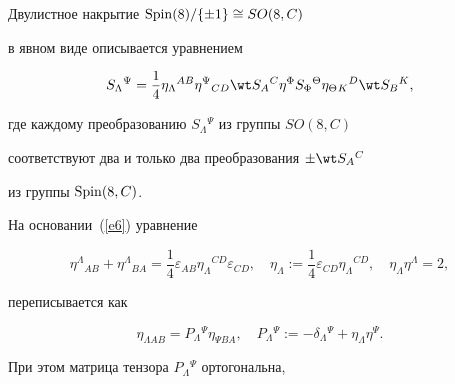 \begin{thm}


\label{theorem2}


Двулистное накрытие $\operatorname{Spin}(8)/\{\pm 1\}\cong SO(8,C)$


в явном виде описывается уравнением


\begin{equation}


\label{e30}


S_\Lambda{}^\Psi=\frac{1}{4}\eta_\Lambda{}^{AB}\eta^\Psi{}_{CD}


\wt S_A{}^C\eta^\Phi S_\Phi{}^\Theta\eta_\Theta{}_K{}^D\wt S_B{}^K,


\end{equation}


где каждому преобразованию $S_\Lambda{}^\Psi$ из группы $SO(8,C)$


соответствуют два и только два преобразования $\pm\wt S_A{}^C$


из группы $\operatorname{Spin}(8,C)$.


\end{thm}





На основании~(\ref{e6}) уравнение


\begin{equation}


\label{e44}


\eta^\Lambda{}_{AB}+\eta^\Lambda{}_{BA}=


\frac{1}{4}\varepsilon_{AB}\eta_\Lambda{}^{CD}\varepsilon_{CD},\quad


\eta_\Lambda:=\frac{1}{4}\varepsilon_{CD}\eta_\Lambda{}^{CD},\quad


\eta_\Lambda\eta^\Lambda=2,


\end{equation}


переписывается как


\begin{equation}


\label{e45}


\eta_{\Lambda AB}=P_\Lambda{}^\Psi\eta_{\Psi BA},\quad


P_\Lambda{}^\Psi:=-\delta_\Lambda{}^\Psi+\eta_\Lambda\eta^\Psi.


\end{equation}


При этом матрица тензора $P_\Lambda{}^\Psi$ ортогональна,


